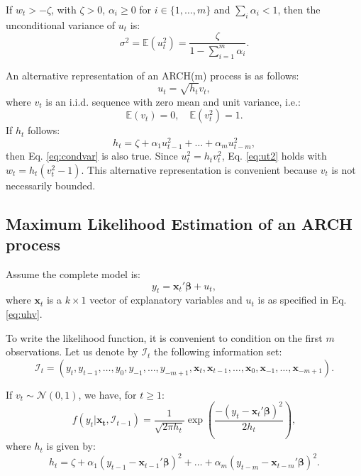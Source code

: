 \documentclass[
  12pt,
]{book}
\theoremstyle{definition}
\theoremstyle{definition}
\theoremstyle{definition}
\theoremstyle{definition}
\theoremstyle{remark}
\begin{document}
If \(w_t > -\zeta\), with \(\zeta>0\), \(\alpha_i\ge0\) for \(i \in \{1,\dots,m\}\) and \(\sum_i \alpha_i<1\), then the unconditional variance of \(u_t\) is:
\[
\sigma^2 = \mathbb{E}(u_t^2) = \frac{\zeta}{1 - \sum_{i=1}^m \alpha_i}.
\]

An alternative representation of an ARCH(m) process is as follows:
\begin{equation}
u_t = \sqrt{h_t}v_t,\label{eq:uhv}
\end{equation}
where \(v_t\) is an i.i.d. sequence with zero mean and unit variance, i.e.:
\[
\mathbb{E}(v_t) = 0, \quad \mathbb{E}(v_t^2) = 1.
\]
If \(h_t\) follows:
\begin{equation}
h_t = \zeta + \alpha_1 u_{t-1}^2 + \dots + \alpha_m u_{t-m}^2,\label{eq:hARCH}
\end{equation}
then Eq. \eqref{eq:condvar} is also true. Since \(u_t^2 = h_t v_t^2\), Eq. \eqref{eq:ut2} holds with \(w_t = h_t (v_t^2-1)\). This alternative representation is convenient because \(v_t\) is not necessarily bounded.

\hypertarget{maximum-likelihood-estimation-of-an-arch-process}{%
\subsection{Maximum Likelihood Estimation of an ARCH process}\label{maximum-likelihood-estimation-of-an-arch-process}}

Assume the complete model is:
\[
y_t = \mathbf{x}_t'\boldsymbol\beta + u_t,
\]
where \(\mathbf{x}_t\) is a \(k \times 1\) vector of explanatory variables and \(u_t\) is as specified in Eq. \eqref{eq:uhv}.

To write the likelihood function, it is convenient to condition on the first \(m\) observations. Let us denote by \(\mathcal{I}_t\) the following information set:
\[
\mathcal{I}_t = (y_t,y_{t-1},\dots,y_0,y_{-1},\dots,y_{-m+1}, \mathbf{x}_t,\mathbf{x}_{t-1},\dots,\mathbf{x}_0,\mathbf{x}_{-1},\dots,\mathbf{x}_{-m+1}).
\]

If \(v_t \sim \mathcal{N}(0,1)\), we have, for \(t\ge1\):
\begin{equation}
f(y_t|\mathbf{x_t},\mathcal{I}_{t-1}) = \frac{1}{\sqrt{2 \pi h_t}}\exp\left(\frac{-(y_t-\mathbf{x}_t'\boldsymbol\beta)^2}{2h_t}\right),\label{eq:densityN}
\end{equation}
where \(h_t\) is given by:
\[
h_t = \zeta + \alpha_1 (y_{t-1} - \mathbf{x}_{t-1}'\boldsymbol\beta)^2 + \dots + \alpha_m (y_{t-m} - \mathbf{x}_{t-m}'\boldsymbol\beta)^2.
\]
\end{document}
